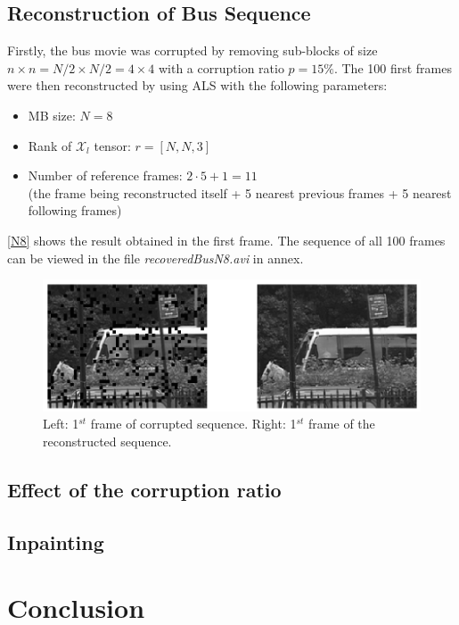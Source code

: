 \documentclass[a4paper, 11pt]{article} %
\def \t {\times}
\def \Xl {\mathcal{X}_{l}}
\begin{document}
\subsection{Reconstruction of Bus Sequence}
Firstly, the bus movie was corrupted by removing sub-blocks of size $n\t n=N/2\t N/2=4\t 4$ with a corruption ratio $p=15\%$.
The 100 first frames were then reconstructed by using ALS with the following parameters:
\begin{itemize}
\item MB size: $N=8$
\item Rank of $\Xl$ tensor: $r=[N, N, 3]$
\item Number of reference frames: $2\cdot 5+1=11$    \\ (the frame being reconstructed itself + 5 nearest previous frames + 5 nearest following frames)
\end{itemize}

\autoref{N8} shows the result obtained in the first frame. The sequence of all 100 frames can be viewed in the file \textit{recoveredBusN8.avi} in annex.

\begin{figure}[h!]
\centering
\includegraphics[scale=0.8]{myposter}
\caption{Left: 1$^{st}$ frame of corrupted sequence. Right: 1$^{st}$ frame of the reconstructed sequence. \label{N8}}
\end{figure}
  

\subsection{Effect of the corruption ratio}

\subsection{Inpainting}

\section{Conclusion}
\end{document}
